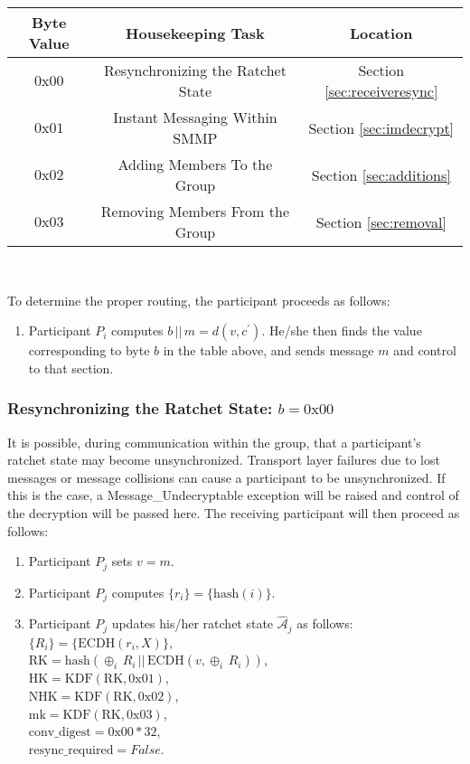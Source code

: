 \documentclass[%
preprint,
amsmath,amssymb,
aps,
prb,
floatfix,
]{revtex4-1}
\begin{document}
\begin{centering}
\begin{tabular}{|c|c|c|}
\hline
Byte Value & Housekeeping Task & Location \\
\hline
$0\mathrm{x}00$ & Resynchronizing the Ratchet State  & Section \ref{sec:receiveresync}\\
$0\mathrm{x}01$ & Instant Messaging Within SMMP & Section \ref{sec:imdecrypt}\\
$0\mathrm{x}02$ & Adding Members To the Group & Section \ref{sec:additions}\\
$0\mathrm{x}03$ & Removing Members From the Group & Section \ref{sec:removal}\\
\hline
\end{tabular} \\
\end{centering}
\bigskip
To determine the proper routing, the
participant proceeds as follows:
\begin{enumerate}
\item Participant $P_i$ computes $b \, || \, m = d(v, c^\prime)$. He/she then
finds the value corresponding to byte $b$ in the table above, and sends message
$m$ and control to that section.
\end{enumerate}
\subsubsection{\label{sec:receiveresync}Resynchronizing the Ratchet State: $b =
0\mathrm{x}00$}
It is possible, during communication within the group, that a participant's
ratchet state may become unsynchronized. Transport layer failures due to lost
messages or message collisions can cause a participant to be unsynchronized. If
this is the case, a Message\_Undecryptable exception will be raised
and control of the decryption will be passed here. The receiving participant
will then proceed as follows:
\begin{enumerate}
\item Participant $P_j$ sets $v = m$.
\item Participant $P_j$ computes $\{r_i\} = \{\mathrm{hash}(i)\}$.
\item Participant $P_j$ updates his/her ratchet state
$\mathcal{\hat{A}}_j$ as follows:\\
$\{R_i\} = \{\mathrm{ECDH}(r_i, X)\}$, \\
$\mathrm{RK} = \mathrm{hash}(\oplus_i \, R_i \, || \, \mathrm{ECDH}(v, \oplus_i
\, R_i))$, \\
$\mathrm{HK} = \mathrm{KDF}(\mathrm{RK}, 0\mathrm{x}01)$, \\
$\mathrm{NHK} = \mathrm{KDF}(\mathrm{RK}, 0\mathrm{x}02)$, \\
$\mathrm{mk} = \mathrm{KDF}(\mathrm{RK}, 0\mathrm{x}03)$, \\
$\mathrm{conv\_digest} = 0\mathrm{x}00 * 32$, \\
$\mathrm{resync\_required} = False$.
\end{enumerate}
\end{document}
